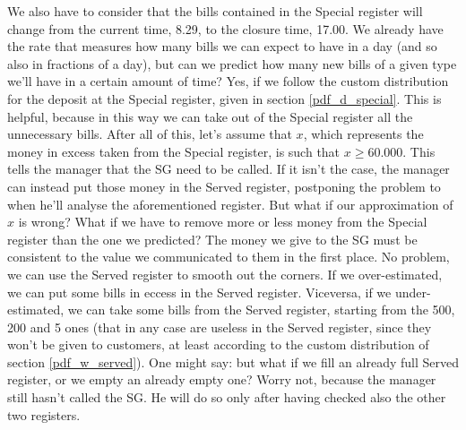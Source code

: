 \documentclass{article}
\begin{document}
\newline
We also have to consider that the bills contained in the Special register will change from the current time, 8.29, to the closure time, 17.00. We already have the rate that measures how many bills we can expect to have in a day (and so also in fractions of a day), but can we predict how many new bills of a given type we'll have in a certain amount of time? Yes, if we follow the custom distribution for the deposit at the Special register, given in section \ref{pdf_d_special}. This is helpful, because in this way we can take out of the Special register all the unnecessary bills. After all of this, let's assume that $x$, which represents the money in excess taken from the Special register, is such that $x \geq 60.000$. This tells the manager that the SG need to be called. If it isn't the case, the manager can instead put those money in the Served register, postponing the problem to when he'll analyse the aforementioned register.
But what if our approximation of $x$ is wrong? What if we have to remove more or less money from the Special register than the one we predicted? The money we give to the SG must be consistent to the value we communicated to them in the first place. No problem, we can use the Served register to smooth out the corners. If we over-estimated, we can put some bills in eccess in the Served register. Viceversa, if we under-estimated, we can take some bills from the Served register, starting from the 500, 200 and 5 ones (that in any case are useless in the Served register, since they won't be given to customers, at least according to the custom distribution of section \ref{pdf_w_served}). One might say: but what if we fill an already full Served register, or we empty an already empty one? Worry not, because the manager still hasn't called the SG. He will do so only after having checked also the other two registers.
\end{document}
